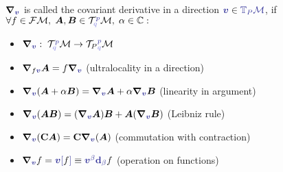\begin{definition}
\label{def:covariantDerivative}
    $\bm\nabla_{\bluee{\bm v}}$ is called the covariant derivative in a direction $\bluee{\bm v} \in \bluee{\T_P\M}$, if $\forall f\in\FM, \; \bm A,\bm B\in \TT^{\bluee p}_{\blueee q} \M,\; \alpha\in\C: $
    \begin{itemize}
        \item $\bm\nabla_{\bluee{\bm v}}:\; \TT^{\bluee p}_{\blueee q} \M \rightarrow {\TT_P}^{\bluee p}_{\blueee q} \M$
        \item $\bm\nabla_{f\bluee{\bm v}}\bm A=f\bm\nabla_{\bluee{\bm v}} $ (ultralocality in a direction)
        \item $\bm\nabla_{\bluee{\bm v}}(\bm A+\alpha \bm B)=\bm\nabla_{\bluee{\bm v}}\bm A+\alpha\bm\nabla_{\bluee{\bm v}}\bm B$ (linearity in argument)
        \item $\bm\nabla_{\bluee{\bm v}}(\bm{AB})=(\bm\nabla_{\bluee{\bm v}}\bm A)\bm B+\bm A(\bm\nabla_{\bluee{\bm v}}\bm B)$ (Leibniz rule)
        \item $\bm\nabla_{\bluee{\bm v}}(\mathbf C \bm A)=\mathbf C \bm\nabla_{\bluee{\bm v}}(\bm A)$ (commutation with contraction)
        \item $\bm\nabla_{\bluee{\bm v}}f=\bluee{\bm v[}f\bluee ]\equiv\bluee{\bm v^\beta \bm \d_\beta} f$ (operation on functions)
    \end{itemize}
\end{definition}


    
